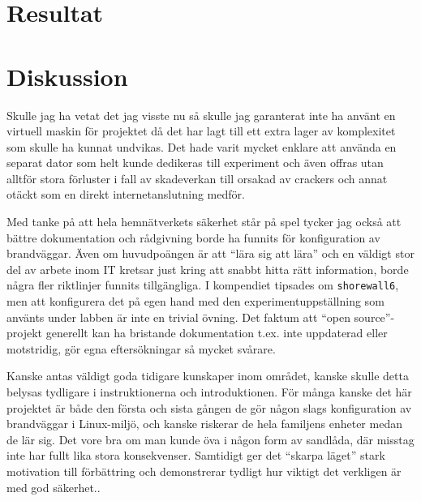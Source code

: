 %
%
%


\section{Resultat}

\section{Diskussion}
Skulle jag ha vetat det jag visste nu så skulle jag garanterat inte ha använt
en virtuell maskin för projektet då det har lagt till ett extra lager av
komplexitet som skulle ha kunnat undvikas. Det hade varit mycket enklare att
använda en separat dator som helt kunde dedikeras till experiment och även
offras utan alltför stora förluster i fall av skadeverkan till orsakad av
crackers och annat otäckt som en direkt internetanslutning medför.

Med tanke på att hela hemnätverkets säkerhet står på spel tycker jag också att
bättre dokumentation och rådgivning borde ha funnits för konfiguration av
brandväggar.  Även om huvudpoängen är att ``lära sig att lära'' och en väldigt
stor del av arbete inom IT kretsar just kring att snabbt hitta rätt
information, borde några fler riktlinjer funnits tillgängliga.  I kompendiet
tipsades om \texttt{shorewall6}, men att konfigurera det på egen hand med den
experimentuppställning som använts under labben är inte en trivial övning.  Det
faktum att ``open source''-projekt generellt kan ha bristande dokumentation
\cite{baddoc:1} \cite{baddoc:2} \cite{baddoc:3} \cite{baddoc:4} t.ex. inte
uppdaterad eller motstridig, gör egna eftersökningar så mycket svårare.

Kanske antas väldigt goda tidigare kunskaper inom området, kanske skulle detta
belysas tydligare i instruktionerna och introduktionen.  För många kanske det
här projektet är både den första och sista gången de gör någon slags konfiguration av
brandväggar i Linux-miljö, och kanske riskerar de hela familjens enheter medan
de lär sig.  Det vore bra om man kunde öva i någon form av sandlåda, där misstag
inte har fullt lika stora konsekvenser.
Samtidigt ger det ``skarpa läget'' stark motivation till förbättring och
demonstrerar tydligt hur viktigt det verkligen är med god säkerhet..


